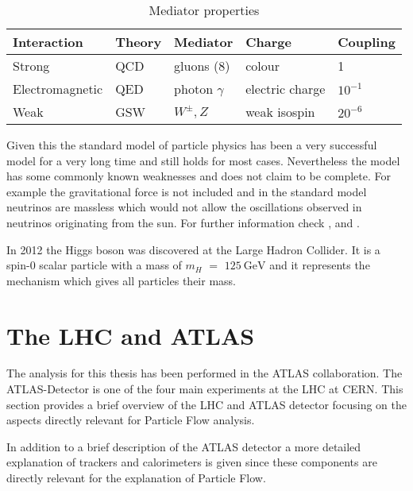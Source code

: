 \begin{table}[h]
\centering
\renewcommand{\arraystretch}{1.5}
\begin{tabular}{|l|l|l|l|l|}
\hline
Interaction     & Theory & Mediator        & Charge          & Coupling  \\ \hline
Strong          & QCD    & gluons (8)      & colour          & 1         \\ \hline
Electromagnetic & QED    & photon $\gamma$ & electric charge & $10^{-1}$ \\ \hline
Weak            & GSW    & $W^{\pm}, Z$    & weak isospin    & $20^{-6}$ \\ \hline
\end{tabular}
\caption{Mediator properties}
\label{mediator properties}
\end{table}

Given this the standard model of particle physics has been a very successful model for a very long time and still holds for most cases.
Nevertheless the model has some commonly known weaknesses and does not claim to be complete. For example the gravitational force is not included and in the standard model neutrinos are massless which would not allow the oscillations observed in neutrinos originating from the sun.
For further information check \cite{griffith08}, \cite{thomson13} and \cite{brock11}.

In 2012 the Higgs boson was discovered at the Large Hadron Collider. It is a spin-0 scalar particle with a mass of $m_H$ $=$ $\SI{125}{\GeV}$ and it represents the mechanism which gives all particles their mass.

\newpage





\section{The LHC and ATLAS}

The analysis for this thesis has been performed in the ATLAS collaboration. The ATLAS-Detector is one of the four main experiments at the LHC at CERN. This section provides a brief overview of the LHC and ATLAS detector focusing on the aspects directly relevant for Particle Flow analysis.

In addition to a brief description of the ATLAS detector a more detailed explanation of trackers and calorimeters is given since these components are directly relevant for the explanation of Particle Flow.

